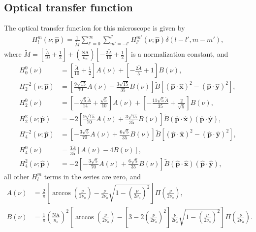 \documentclass[11pt]{article}
\providecommand{\mh}[1]{\mathbf{\hat{#1}}}
\begin{document}
\subsection{Optical transfer function}
The optical transfer function for this microscope is given by
\begin{align}
  H_l^m(\nu; \mh{p}) = \frac{1}{\tilde{M}}\sum_{l'=0}^{\infty}\sum_{m'=-l'}^{l'} H_{l'}^{m'}(\nu; \mh{p})\delta(l - l', m - m'),  
\end{align}
where
$\tilde{M} = \left[\frac{\tilde{A}}{10} + \frac{1}{2}\right] + \left(\frac{\text{NA}}{n_o}\right)\left[-\frac{2\tilde{A}}{10} + \frac{1}{2}\right]$ is a
normalization constant, and
\begin{align}
  H_0^0(\nu) &= \left[\frac{\tilde{A}}{10} + \frac{1}{2}\right]A(\nu) + \left[-\frac{2\tilde{A}}{5} + 1\right]B(\nu),\\
  H_2^{-2}(\nu; \mh{p}) &= \left[\frac{9\sqrt{15}}{70}A(\nu) + \frac{3\sqrt{15}}{35}B(\nu)\right]\tilde{B}[(\mh{p}\cdot\mh{x})^2 - (\mh{p}\cdot\mh{y})^2],\\
  H_2^0(\nu) &= \left[-\frac{\sqrt{5}\tilde{A}}{14} + \frac{\sqrt{5}}{10}\right]A(\nu) + \left[-\frac{11\sqrt{5}\tilde{A}}{35} + \frac{2}{\sqrt{5}}\right]B(\nu),\\
  H_2^2(\nu; \mh{p}) &= -2\left[\frac{9\sqrt{15}}{70}A(\nu) + \frac{3\sqrt{15}}{35}B(\nu)\right]\tilde{B}(\mh{p}\cdot\mh{x})(\mh{p}\cdot\mh{y}),\\
  H_4^{-2}(\nu; \mh{p}) &= \left[-\frac{3\sqrt{5}}{70}A(\nu) + \frac{6\sqrt{5}}{35}B(\nu)\right]\tilde{B}[(\mh{p}\cdot\mh{x})^2 - (\mh{p}\cdot\mh{y})^2],\\
  H_4^0(\nu) &= \frac{3\tilde{A}}{35}[A(\nu) - 4B(\nu)],\\
  H_4^2(\nu; \mh{p}) &= -2\left[-\frac{3\sqrt{5}}{70}A(\nu) + \frac{6\sqrt{5}}{35}B(\nu)\right]\tilde{B}(\mh{p}\cdot\mh{x})(\mh{p}\cdot\mh{y}),
\end{align}
all other $H_l^m$ terms in the series are zero, and  
\begin{align}
  A(\nu) &= \frac{2}{\pi}\left[\arccos\left(\frac{\nu}{2\nu_o}\right) - \frac{\nu}{2\nu_o}\sqrt{1 - \left(\frac{\nu}{2\nu_o}\right)^2}\right]\Pi\left(\frac{\nu}{2\nu_o}\right),\\
  B(\nu) &= \frac{1}{\pi}\left(\frac{\text{NA}}{n_o}\right)^2\left[\arccos\left(\frac{\nu}{2\nu_o}\right) - \left[3 - 2\left(\frac{\nu}{2\nu_o}\right)^2\right]\frac{\nu}{2\nu_o} \sqrt{1 - \left(\frac{\nu}{2\nu_o}\right)^2}\right]\Pi\left(\frac{\nu}{2\nu_o}\right).                 
\end{align}


{}

\end{document}
